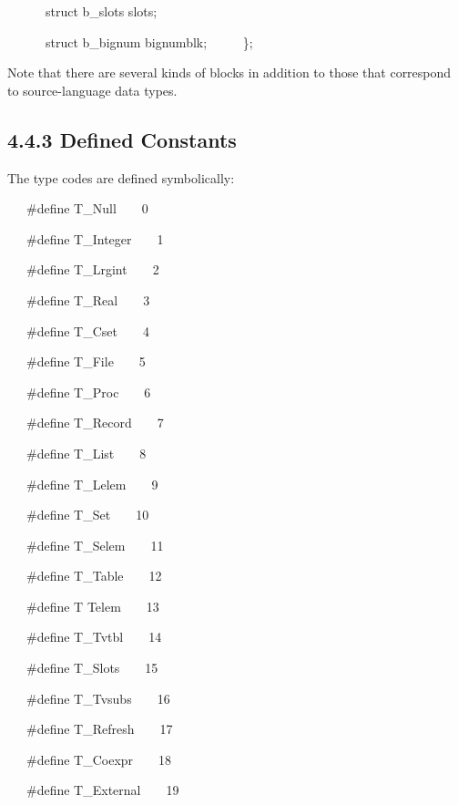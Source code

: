 \ \ \ \ \ \ struct b\_slots slots;


\ \ \ \ \ \ struct b\_bignum bignumblk;\newline
 \ \ \ \ \ \};


Note that there are several kinds of blocks in addition to those that
correspond to source-language data types.

\subsection[4.4.3 Defined Constants]{4.4.3 Defined Constants}

The type codes are defined symbolically:

{\ttfamily\mdseries
\ \ \ \#define T\_Null\ \ \ \ 0}

{\ttfamily\mdseries
\ \ \ \#define T\_Integer\ \ \ \ 1}

{\ttfamily\mdseries
\ \ \ \#define T\_Lrgint\ \ \ \ 2}

{\ttfamily\mdseries
\ \ \ \#define T\_Real\ \ \ \ 3}

{\ttfamily\mdseries
\ \ \ \#define T\_Cset\ \ \ \ 4}

{\ttfamily\mdseries
\ \ \ \#define T\_File\ \ \ \ 5}

{\ttfamily\mdseries
\ \ \ \#define T\_Proc\ \ \ \ 6}

{\ttfamily\mdseries
\ \ \ \#define T\_Record\ \ \ \ 7}

{\ttfamily\mdseries
\ \ \ \#define T\_List\ \ \ \ 8}

{\ttfamily\mdseries
\ \ \ \#define T\_Lelem\ \ \ \ 9}

{\ttfamily\mdseries
\ \ \ \#define T\_Set\ \ \ \ 10}

{\ttfamily\mdseries
\ \ \ \#define T\_Selem\ \ \ \ 11}

{\ttfamily\mdseries
\ \ \ \#define T\_Table\ \ \ \ 12}

{\ttfamily\mdseries
\ \ \ \#define T Telem\ \ \ \ 13}

{\ttfamily\mdseries
\ \ \ \#define T\_Tvtbl\ \ \ \ 14}

{\ttfamily\mdseries
\ \ \ \#define T\_Slots\ \ \ \ 15}

{\ttfamily\mdseries
\ \ \ \#define T\_Tvsubs\ \ \ \ 16}

{\ttfamily\mdseries
\ \ \ \#define T\_Refresh\ \ \ \ 17}

{\ttfamily\mdseries
\ \ \ \#define T\_Coexpr\ \ \ \ 18}

{\ttfamily\mdseries
\ \ \ \#define T\_External\ \ \ \ 19}

